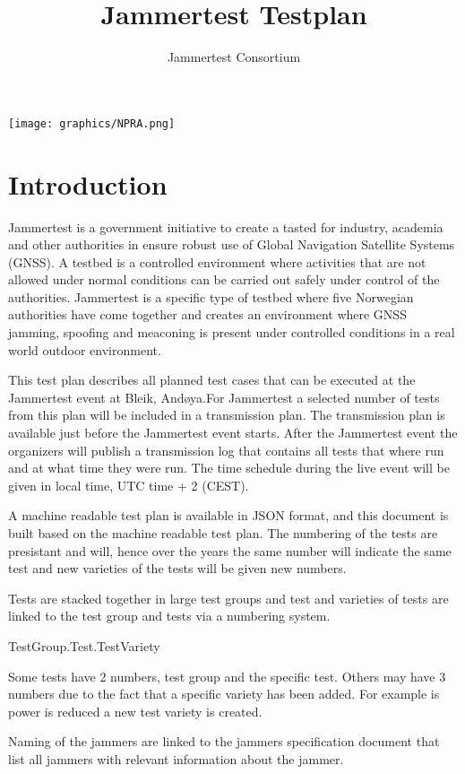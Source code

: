 \documentclass{book}
\title{Jammertest Testplan}
\author{Jammertest Consortium}
\date{ }
\begin{document}
\maketitle
\texttt{[image: graphics/NPRA.png]}

\tableofcontents

\section{Introduction}
Jammertest is a government initiative to create a tasted for industry, academia and other authorities in ensure robust use of Global Navigation Satellite Systems (GNSS). A testbed is a controlled environment where activities that are not allowed under normal conditions can be carried out safely under control of the authorities. Jammertest is a specific type of testbed where five Norwegian authorities have come together and creates an environment where GNSS jamming, spoofing and meaconing is present under controlled conditions in a real world outdoor environment.

This test plan describes all planned test cases that can be executed at the Jammertest event at Bleik, Andøya.For Jammertest a selected number of tests from this plan will be included in a transmission plan. The transmission plan is available just before the Jammertest event starts. After the Jammertest event the organizers will publish a transmission log that contains all tests that where run and at what time they were run. The time schedule during the live event will be given in local time, UTC time + 2 (CEST).

A machine readable test plan is available in JSON format, and this document is built based on the machine readable test plan. The numbering of the tests are presistant and will, hence over the years the same number will indicate the same test and new varieties of the tests will be given new numbers.

Tests are stacked together in large test groups and test and varieties of tests are linked to the test group and tests via a numbering system.

TestGroup.Test.TestVariety

Some tests have 2 numbers, test group and the specific test. Others may have 3 numbers due to the fact that a specific variety has been added. For example is power is reduced a new test variety is created.


Naming of the jammers are linked to the jammers specification document that list all jammers with relevant information about the jammer.
\end{document}
